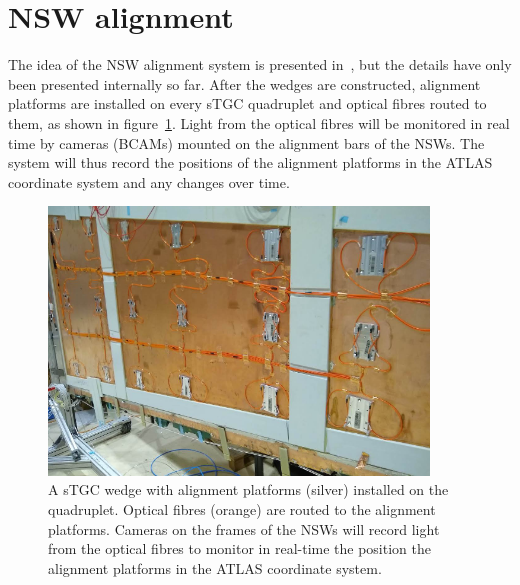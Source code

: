 \section{NSW alignment}
\label{sec:nsw_alignment}

The idea of the NSW alignment system is presented in~\cite{nsw_tdr}, but the details have only been presented internally so far. After the wedges are constructed, alignment platforms are installed on every sTGC quadruplet and optical fibres routed to them, as shown in figure~\ref{fig:alignment_platforms}. Light from the optical fibres will be monitored in real time by cameras (BCAMs) mounted on the alignment bars of the NSWs. The system will thus record the positions of the alignment platforms in the ATLAS coordinate system and any changes over time. %

\begin{figure}
    \centering
    \includegraphics[width = 0.9\textwidth]{figures/alignment_platforms_lefebvre.png}
    \caption{A sTGC wedge with alignment platforms (silver) installed on the quadruplet. Optical fibres (orange) are routed to the alignment platforms. Cameras on the frames of the NSWs will record light from the optical fibres to monitor in real-time the position the alignment platforms in the ATLAS coordinate system.}
    \label{fig:alignment_platforms}
\end{figure}

